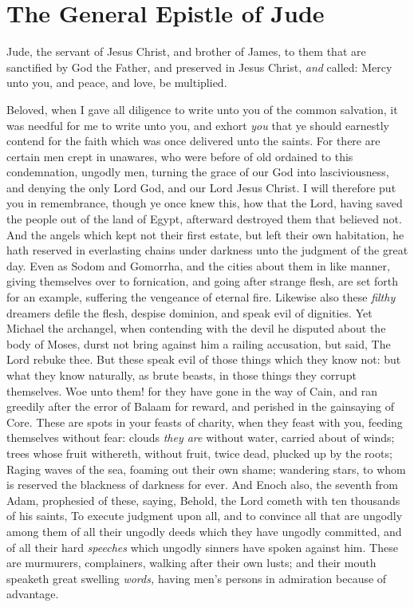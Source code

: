 \documentclass[11pt,letterpaper,oneside]{memoir}
\begin{document}
\chapter[Jude]{The General Epistle of Jude}
Jude, the servant of Jesus Christ, and brother of James, to them that
are sanctified by God the Father, and preserved in Jesus Christ,
\emph{and} called: Mercy unto you, and peace, and love, be multiplied.

Beloved, when I gave all diligence to write unto you of the common
salvation, it was needful for me to write unto you, and exhort
\emph{you} that ye should earnestly contend for the faith which was once
delivered unto the saints. For there are certain men crept in unawares,
who were before of old ordained to this condemnation, ungodly men,
turning the grace of our God into lasciviousness, and denying the only
Lord God, and our Lord Jesus Christ. I will therefore put you in
remembrance, though ye once knew this, how that the Lord, having saved
the people out of the land of Egypt, afterward destroyed them that
believed not. And the angels which kept not their first estate, but left
their own habitation, he hath reserved in everlasting chains under
darkness unto the judgment of the great day. Even as Sodom and Gomorrha,
and the cities about them in like manner, giving themselves over to
fornication, and going after strange flesh, are set forth for an
example, suffering the vengeance of eternal fire. Likewise also these
\emph{filthy} dreamers defile the flesh, despise dominion, and speak
evil of dignities. Yet Michael the archangel, when contending with the
devil he disputed about the body of Moses, durst not bring against him a
railing accusation, but said, The Lord rebuke thee. But these speak evil
of those things which they know not: but what they know naturally, as
brute beasts, in those things they corrupt themselves. Woe unto them!
for they have gone in the way of Cain, and ran greedily after the error
of Balaam for reward, and perished in the gainsaying of Core. These are
spots in your feasts of charity, when they feast with you, feeding
themselves without fear: clouds \emph{they are} without water, carried
about of winds; trees whose fruit withereth, without fruit, twice dead,
plucked up by the roots; Raging waves of the sea, foaming out their own
shame; wandering stars, to whom is reserved the blackness of darkness
for ever. And Enoch also, the seventh from Adam, prophesied of these,
saying, Behold, the Lord cometh with ten thousands of his saints, To
execute judgment upon all, and to convince all that are ungodly among
them of all their ungodly deeds which they have ungodly committed, and
of all their hard \emph{speeches} which ungodly sinners have spoken
against him. These are murmurers, complainers, walking after their own
lusts; and their mouth speaketh great swelling \emph{words,} having
men's persons in admiration because of advantage.
\end{document}
